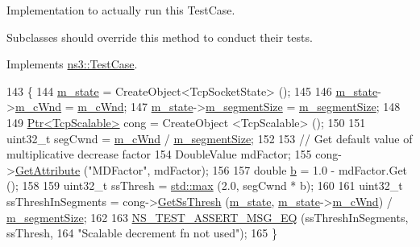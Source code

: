 Implementation to actually run this Test\+Case. 

Subclasses should override this method to conduct their tests. 

Implements \hyperlink{classns3_1_1TestCase_a8ff74680cf017ed42011e4be51917a24}{ns3\+::\+Test\+Case}.


\begin{DoxyCode}
143 \{
144   \hyperlink{classTcpScalableDecrementTest_a48e6388606dba30357673eab458bea25}{m\_state} = CreateObject<TcpSocketState> ();
145 
146   \hyperlink{classTcpScalableDecrementTest_a48e6388606dba30357673eab458bea25}{m\_state}->\hyperlink{classns3_1_1TcpSocketState_a7cd3d2156a483c1db436097477a0fd7f}{m\_cWnd} = \hyperlink{classTcpScalableDecrementTest_aa18d287ac42c4ab0621a19eaf5bc6a5d}{m\_cWnd};
147   \hyperlink{classTcpScalableDecrementTest_a48e6388606dba30357673eab458bea25}{m\_state}->\hyperlink{classns3_1_1TcpSocketState_a079872f7b0099ef5f3cab4ff47bd2edd}{m\_segmentSize} = \hyperlink{classTcpScalableDecrementTest_a12ef20778091715637bbd243248fcf93}{m\_segmentSize};
148 
149   \hyperlink{classns3_1_1Ptr}{Ptr<TcpScalable>} cong = CreateObject <TcpScalable> ();
150 
151   uint32\_t segCwnd = \hyperlink{classTcpScalableDecrementTest_aa18d287ac42c4ab0621a19eaf5bc6a5d}{m\_cWnd} / \hyperlink{classTcpScalableDecrementTest_a12ef20778091715637bbd243248fcf93}{m\_segmentSize};
152 
153   \textcolor{comment}{// Get default value of multiplicative decrease factor}
154   DoubleValue mdFactor;
155   cong->\hyperlink{classns3_1_1ObjectBase_a895d1de2f96063d0e0fd78463e7a7e30}{GetAttribute} (\textcolor{stringliteral}{"MDFactor"}, mdFactor);
156 
157   \textcolor{keywordtype}{double} \hyperlink{buildings__pathloss_8m_a21ad0bd836b90d08f4cf640b4c298e7c}{b} = 1.0 - mdFactor.Get ();
158 
159   uint32\_t ssThresh = \hyperlink{80211b_8c_affe776513b24d84b39af8ab0930fef7f}{std::max} (2.0, segCwnd * b);
160 
161   uint32\_t ssThreshInSegments = cong->\hyperlink{classns3_1_1TcpScalable_afc28d1793481db0978085efc5b2c243e}{GetSsThresh} (\hyperlink{classTcpScalableDecrementTest_a48e6388606dba30357673eab458bea25}{m\_state}, 
      \hyperlink{classTcpScalableDecrementTest_a48e6388606dba30357673eab458bea25}{m\_state}->\hyperlink{classns3_1_1TcpSocketState_a7cd3d2156a483c1db436097477a0fd7f}{m\_cWnd}) / \hyperlink{classTcpScalableDecrementTest_a12ef20778091715637bbd243248fcf93}{m\_segmentSize};
162 
163   \hyperlink{group__testing_ga2a9d78cffb3db8e867c35fff0b698cf5}{NS\_TEST\_ASSERT\_MSG\_EQ} (ssThreshInSegments, ssThresh,
164                          \textcolor{stringliteral}{"Scalable decrement fn not used"});
165 \}
\end{DoxyCode}


